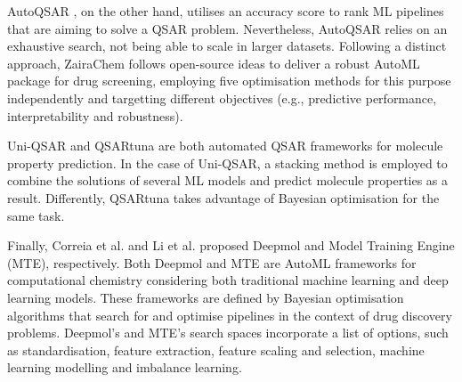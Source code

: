 AutoQSAR \cite{Dixon2016}, on the other hand, utilises an accuracy score to rank ML pipelines that are aiming to solve a QSAR problem. Nevertheless, AutoQSAR relies on an exhaustive search, not being able to scale in larger datasets. Following a distinct approach, ZairaChem \cite{Turon2023} follows open-source ideas to deliver a robust AutoML package for drug screening, employing five optimisation methods for this purpose independently and targetting different objectives (e.g., predictive performance, interpretability and robustness).

Uni-QSAR \cite{Gao2023} and QSARtuna \cite{Mervin2024} are both automated QSAR frameworks for molecule property prediction. In the case of Uni-QSAR, a stacking method is employed to combine the solutions of several ML models and predict molecule properties as a result. Differently, QSARtuna takes advantage of Bayesian optimisation for the same task.

Finally, Correia et al. \cite{Correia2024} and Li et al. \cite{Li2025} proposed Deepmol and Model Training Engine (MTE), respectively. Both Deepmol and MTE are AutoML frameworks for computational chemistry considering both traditional machine learning and deep learning models. These frameworks are defined by Bayesian optimisation algorithms that search for and optimise pipelines in the context of drug discovery problems. Deepmol's and MTE's search spaces incorporate a list of options, such as standardisation, feature extraction, feature scaling and selection, machine learning modelling and imbalance learning.